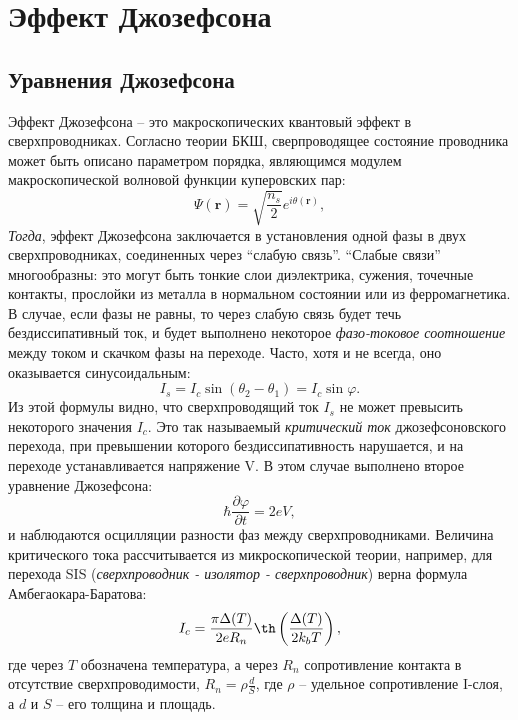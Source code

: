 \documentclass[12pt, twoside]{report}
\numberwithin{equation}{section}
\numberwithin{figure}{section}
\begin{document}
\section{Эффект Джозефсона}
\subsection{Уравнения Джозефсона}
Эффект Джозефсона\cite{Josephson1964} -- это макроскопических квантовый эффект в сверхпроводниках. Согласно теории БКШ, сверпроводящее состояние проводника может быть описано параметром порядка, являющимся модулем макроскопической волновой функции куперовских пар:
\begin{equation}
\Psi(\mathbf{r}) = \sqrt{\frac{n_s}{2}}e^{i\theta(\mathbf{r})},
\label{eq:glwf} 
\end{equation}
\textit{Тогда}, эффект Джозефсона заключается в установления одной фазы в двух сверхпроводниках, соединенных через ``слабую связь''. ``Слабые связи'' многообразны: это могут быть тонкие слои диэлектрика, сужения, точечные контакты, прослойки из металла в нормальном состоянии или из ферромагнетика. В случае, если фазы не равны, то через слабую связь будет течь бездиссипативный ток, и будет выполнено некоторое \textit{фазо-токовое соотношение} между током и скачком фазы на переходе. Часто, хотя и не всегда\cite{Golubov2004}, оно оказывается синусоидальным:
\begin{equation}
I_s = I_c \sin(\theta_2 - \theta_1) = I_c \sin\varphi.
\label{eq:CPR}
\end{equation}
Из этой формулы видно, что сверхпроводящий ток $I_s$ не может превысить некоторого значения $I_c$. Это так называемый \textit{критический ток} джозефсоновского перехода, при превышении которого бездиссипативность нарушается, и на переходе устанавливается напряжение V. В этом случае выполнено второе уравнение Джозефсона:
\begin{equation}
\hbar \frac{\partial \varphi}{\partial t} = 2eV,
\label{eq:2JE}
\end{equation}
и наблюдаются осцилляции разности фаз между сверхпроводниками. Величина критического тока рассчитывается из микроскопической теории, например, для перехода SIS (\textit{сверхпроводник - изолятор - сверхпроводник}) верна формула Амбегаокара-Баратова:
\begin{equation}
I_c = \frac{\pi\Delta(T)}{2eR_n}\th\left(\frac{\Delta(T)}{2k_bT}\right),
\label{eq:Ic}
\end{equation}
где через $T$ обозначена температура, а через $R_n$ сопротивление контакта в отсутствие сверхпроводимости, $R_n = \rho\frac{d}{S}$, где $\rho$ -- удельное сопротивление I-слоя, а $d$ и $S$ -- его толщина и площадь.
\end{document}
